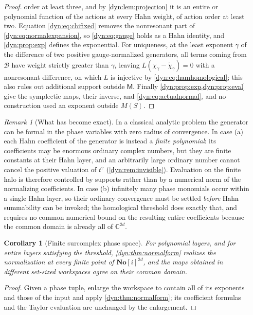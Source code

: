 \documentclass[11pt,letterpaper]{article}
\newtheorem{corollary}[corollary]{Corollary}
\theoremstyle{definition}
\theoremstyle{remark}
\newtheorem{remark}[remark]{Remark}
\newcommand{\C}{\mathbb C}
\newcommand{\No}{\mathbf{No}}
\numberwithin{equation}{section}
\begin{document}
\begin{proof}
order at least three, and by \cref{dyn:lem:projection} it is an entire or
polynomial function of the actions at every Hahn weight, of action order at
least two. Equation \eqref{dyn:eq:chifixed} removes the nonresonant part of
\eqref{dyn:eq:normalexpansion}, so \eqref{dyn:eq:gauge} holds as a Hahn
identity, and \cref{dyn:prop:exp} defines the exponential. For uniqueness,
at the least exponent $\gamma$ of the difference of two positive
gauge-normalized generators, all terms coming from $\mathcal B$ have weight
strictly greater than $\gamma$, leaving
$L(\chi_\gamma-\widetilde\chi_\gamma)=0$ with a nonresonant difference, on
which $L$ is injective by \eqref{dyn:eq:hamhomological}; this also rules
out additional support outside $\mathsf M$. Finally
\cref{dyn:prop:exp,dyn:prop:eval} give the symplectic maps, their inverse,
and \eqref{dyn:eq:actualnormal}, and no construction used an exponent
outside $M(S)$.
\end{proof}

\begin{remark}[What has become exact]\label{dyn:rem:becameexact}
In a classical analytic problem the generator can be formal in the phase
variables with zero radius of convergence. In case (a) each Hahn
coefficient of the generator is instead a \emph{finite polynomial}: its
coefficients may be enormous ordinary complex numbers, but they are finite
constants at their Hahn layer, and an arbitrarily large ordinary number
cannot cancel the positive valuation of $t^{\gamma}$
(\cref{dyn:rem:invisible}). Evaluation on the finite halo is therefore
controlled by supports rather than by a numerical norm of the normalizing
coefficients. In case (b) infinitely many phase monomials occur within a
single Hahn layer, so their ordinary convergence must be settled
\emph{before} Hahn summability can be invoked; the homological threshold
does exactly that, and requires no common numerical bound on the resulting
entire coefficients because the common domain is already all of
$\C^{2d}$.
\end{remark}

\begin{corollary}[Finite surcomplex phase space]\label{dyn:cor:hamsurcomplex}
For polynomial layers, and for entire layers satisfying the threshold,
\cref{dyn:thm:normalform} realizes the normalization at every finite point
of $\No[i]^{2d}$, and the maps obtained in different set-sized workspaces
agree on their common domain.
\end{corollary}
\begin{proof}
Given a phase tuple, enlarge the workspace to contain all of its exponents
and those of the input and apply \cref{dyn:thm:normalform}; its coefficient
formulas and the Taylor evaluation are unchanged by the enlargement.
\end{proof}
\end{document}
